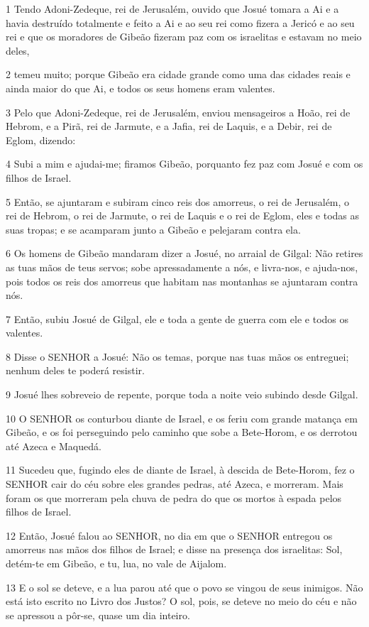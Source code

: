 \par 1 Tendo Adoni-Zedeque, rei de Jerusalém, ouvido que Josué tomara a Ai e a havia destruído totalmente e feito a Ai e ao seu rei como fizera a Jericó e ao seu rei e que os moradores de Gibeão fizeram paz com os israelitas e estavam no meio deles,
\par 2 temeu muito; porque Gibeão era cidade grande como uma das cidades reais e ainda maior do que Ai, e todos os seus homens eram valentes.
\par 3 Pelo que Adoni-Zedeque, rei de Jerusalém, enviou mensageiros a Hoão, rei de Hebrom, e a Pirã, rei de Jarmute, e a Jafia, rei de Laquis, e a Debir, rei de Eglom, dizendo:
\par 4 Subi a mim e ajudai-me; firamos Gibeão, porquanto fez paz com Josué e com os filhos de Israel.
\par 5 Então, se ajuntaram e subiram cinco reis dos amorreus, o rei de Jerusalém, o rei de Hebrom, o rei de Jarmute, o rei de Laquis e o rei de Eglom, eles e todas as suas tropas; e se acamparam junto a Gibeão e pelejaram contra ela.
\par 6 Os homens de Gibeão mandaram dizer a Josué, no arraial de Gilgal: Não retires as tuas mãos de teus servos; sobe apressadamente a nós, e livra-nos, e ajuda-nos, pois todos os reis dos amorreus que habitam nas montanhas se ajuntaram contra nós.
\par 7 Então, subiu Josué de Gilgal, ele e toda a gente de guerra com ele e todos os valentes.
\par 8 Disse o SENHOR a Josué: Não os temas, porque nas tuas mãos os entreguei; nenhum deles te poderá resistir.
\par 9 Josué lhes sobreveio de repente, porque toda a noite veio subindo desde Gilgal.
\par 10 O SENHOR os conturbou diante de Israel, e os feriu com grande matança em Gibeão, e os foi perseguindo pelo caminho que sobe a Bete-Horom, e os derrotou até Azeca e Maquedá.
\par 11 Sucedeu que, fugindo eles de diante de Israel, à descida de Bete-Horom, fez o SENHOR cair do céu sobre eles grandes pedras, até Azeca, e morreram. Mais foram os que morreram pela chuva de pedra do que os mortos à espada pelos filhos de Israel.
\par 12 Então, Josué falou ao SENHOR, no dia em que o SENHOR entregou os amorreus nas mãos dos filhos de Israel; e disse na presença dos israelitas: Sol, detém-te em Gibeão, e tu, lua, no vale de Aijalom.
\par 13 E o sol se deteve, e a lua parou até que o povo se vingou de seus inimigos. Não está isto escrito no Livro dos Justos? O sol, pois, se deteve no meio do céu e não se apressou a pôr-se, quase um dia inteiro.
